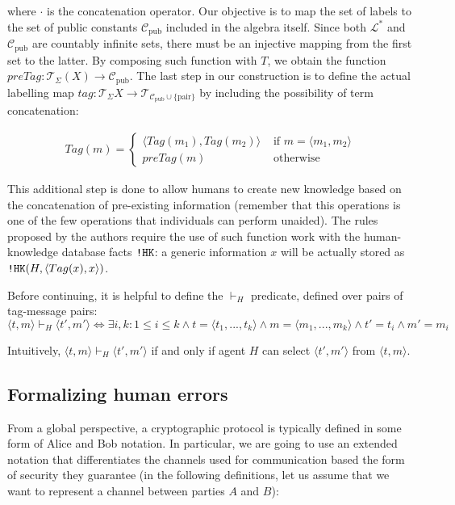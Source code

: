 \documentclass{article}
\newcommand{\mono}[1]{\textrm{\tt #1}}
\newcounter{definition}[section]\setcounter{definition}{0}
\begin{document}
where $\cdot$ is the concatenation operator. Our objective is to map the set of labels to the set of public constants $\mathcal{C}_\textrm{pub}$ included in the algebra itself. Since both $\mathcal{L^*}$ and $\mathcal{C}_\textrm{pub}$ are countably infinite sets, there must be an injective mapping from the first set to the latter. By composing such function with $T$, we obtain the function $preTag : \mathcal{T}_\Sigma(X) \to \mathcal{C}_\textrm{pub}$. The last step in our construction is to define the actual labelling map $tag : \mathcal{T}_\Sigma{X} \to \mathcal{T}_{\mathcal{C}_\textrm{pub} \cup \{\textrm{pair}\} }$ by including the possibility of term concatenation:

\begin{align*}
    Tag(m) =
    \begin{cases}
        \langle Tag(m_1), Tag(m_2) \rangle & \textrm{ if } m = \langle m_1, m_2 \rangle \\
        preTag(m) & \textrm{ otherwise }
    \end{cases}
\end{align*}

This additional step is done to allow humans to create new knowledge based on the concatenation of pre-existing information (remember that this operations is one of the few operations that individuals can perform unaided). The rules proposed by the authors require the use of such function work with the human-knowledge database facts $\mono{!HK}$: a generic information $x$ will be actually stored as $\mono{!HK}(H, \langle Tag(x), x \rangle)$.

Before continuing, it is helpful to define the $\vdash_H$ predicate, defined over pairs of tag-message pairs:
\begin{equation*}
    \langle t, m \rangle \vdash_H \langle t', m' \rangle \iff \exists i, k : 1 \leq i \leq k \land t = \langle t_1, ..., t_k \rangle \land m = \langle m_1, ..., m_k \rangle \land t' = t_i \land m' = m_i
\end{equation*}

Intuitively, $\langle t, m \rangle \vdash_H \langle t', m' \rangle$ if and only if agent $H$ can select $\langle t', m' \rangle$ from $\langle t, m \rangle$.

\subsection{Formalizing human errors}\label{sec:formalizing_human_errors}

From a global perspective, a cryptographic protocol is typically defined in some form of Alice and Bob notation. In particular, we are going to use an extended notation that differentiates the channels used for communication based the form of security they guarantee (in the following definitions, let us assume that we want to represent a channel between parties $A$ and $B$):
\end{document}
